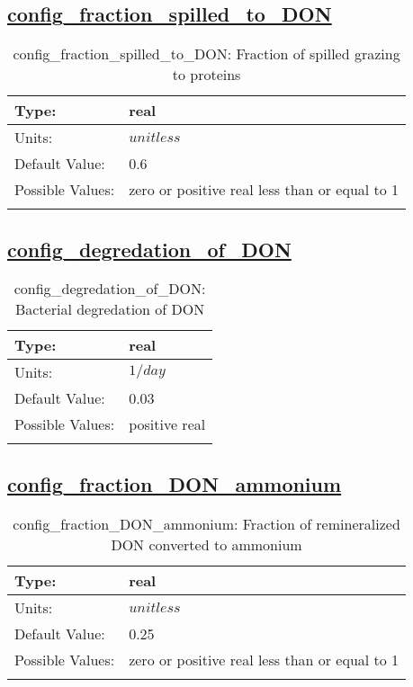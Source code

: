 \subsection[config\_fraction\_spilled\_to\_DON]{\hyperref[sec:nm_tab_biogeochemistry]{config\_fraction\_spilled\_to\_DON}}
\label{subsec:nm_sec_config_fraction_spilled_to_DON}
\begin{center}
\begin{longtable}{| p{2.0in} || p{4.0in} |}
    \hline
    Type: & real \\
    \hline
    Units: & $unitless$ \\
    \hline
    Default Value: & 0.6 \\
    \hline
    Possible Values: & zero or positive real less than or equal to 1 \\
    \hline
    \caption{config\_fraction\_spilled\_to\_DON: Fraction of spilled grazing to proteins}
\end{longtable}
\end{center}
\subsection[config\_degredation\_of\_DON]{\hyperref[sec:nm_tab_biogeochemistry]{config\_degredation\_of\_DON}}
\label{subsec:nm_sec_config_degredation_of_DON}
\begin{center}
\begin{longtable}{| p{2.0in} || p{4.0in} |}
    \hline
    Type: & real \\
    \hline
    Units: & $1/day$ \\
    \hline
    Default Value: & 0.03 \\
    \hline
    Possible Values: & positive real \\
    \hline
    \caption{config\_degredation\_of\_DON: Bacterial degredation of DON}
\end{longtable}
\end{center}
\subsection[config\_fraction\_DON\_ammonium]{\hyperref[sec:nm_tab_biogeochemistry]{config\_fraction\_DON\_ammonium}}
\label{subsec:nm_sec_config_fraction_DON_ammonium}
\begin{center}
\begin{longtable}{| p{2.0in} || p{4.0in} |}
    \hline
    Type: & real \\
    \hline
    Units: & $unitless$ \\
    \hline
    Default Value: & 0.25 \\
    \hline
    Possible Values: & zero or positive real less than or equal to 1 \\
    \hline
    \caption{config\_fraction\_DON\_ammonium: Fraction of remineralized DON converted to ammonium}
\end{longtable}
\end{center}

